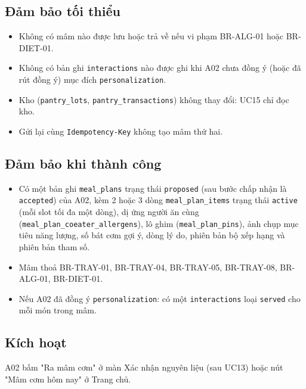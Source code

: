 \subsection{Đảm bảo tối thiểu}
\begin{itemize}
\item Không có mâm nào được lưu hoặc trả về nếu vi phạm BR-\allowbreak{}ALG-\allowbreak{}01 hoặc BR-\allowbreak{}DIET-\allowbreak{}01.
\item Không có bản ghi {\small\texttt{interactions}} nào được ghi khi A02 chưa đồng ý (hoặc đã rút đồng ý) mục đích {\small\texttt{personalization}}.
\item Kho ({\small\texttt{pantry\_\allowbreak{}\allowbreak{}lots}}, {\small\texttt{pantry\_\allowbreak{}\allowbreak{}transactions}}) không thay đổi: UC15 chỉ đọc kho.
\item Gửi lại cùng {\small\texttt{Idempotency-\allowbreak{}Key}} không tạo mâm thứ hai.
\end{itemize}
\subsection{Đảm bảo khi thành công}
\begin{itemize}
\item Có một bản ghi {\small\texttt{meal\_\allowbreak{}\allowbreak{}plans}} trạng thái {\small\texttt{proposed}} (sau bước chấp nhận là {\small\texttt{accepted}}) của A02, kèm 2 hoặc 3 dòng {\small\texttt{meal\_\allowbreak{}\allowbreak{}plan\_\allowbreak{}\allowbreak{}items}} trạng thái {\small\texttt{active}} (mỗi slot tối đa một dòng), dị ứng người ăn cùng ({\small\texttt{meal\_\allowbreak{}\allowbreak{}plan\_\allowbreak{}\allowbreak{}coeater\_\allowbreak{}\allowbreak{}allergens}}), lô ghim ({\small\texttt{meal\_\allowbreak{}\allowbreak{}plan\_\allowbreak{}\allowbreak{}pins}}), ảnh chụp mục tiêu năng lượng, số bát cơm gợi ý, dòng lý do, phiên bản bộ xếp hạng và phiên bản tham số.
\item Mâm thoả BR-\allowbreak{}TRAY-\allowbreak{}01, BR-\allowbreak{}TRAY-\allowbreak{}04, BR-\allowbreak{}TRAY-\allowbreak{}05, BR-\allowbreak{}TRAY-\allowbreak{}08, BR-\allowbreak{}ALG-\allowbreak{}01, BR-\allowbreak{}DIET-\allowbreak{}01.
\item Nếu A02 đã đồng ý {\small\texttt{personalization}}: có một {\small\texttt{interactions}} loại {\small\texttt{served}} cho mỗi món trong mâm.
\end{itemize}
\subsection{Kích hoạt}
A02 bấm "Ra mâm cơm" ở màn Xác nhận nguyên liệu (sau UC13) hoặc nút "Mâm cơm hôm nay" ở Trang chủ.

